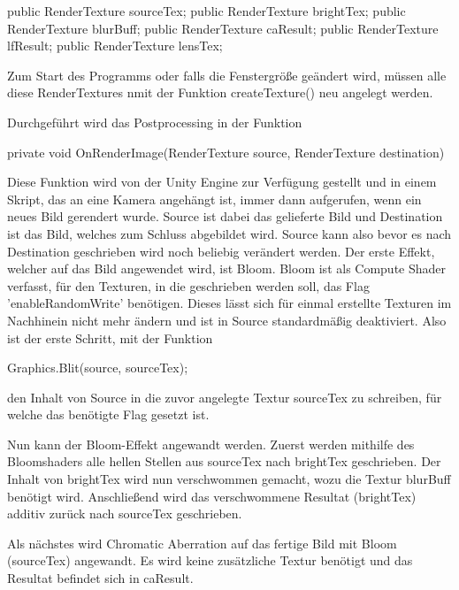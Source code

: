 \begin{csh}
    public RenderTexture sourceTex;
    public RenderTexture brightTex;
    public RenderTexture blurBuff;
    public RenderTexture caResult;
    public RenderTexture lfResult;
    public RenderTexture lensTex;
\end{csh}

Zum Start des Programms oder falls die Fenstergrö{\ss}e geändert wird, müssen alle diese RenderTextures nmit der Funktion createTexture() neu angelegt werden.

Durchgeführt wird das Postprocessing in der Funktion 
\begin{csh} 
private void OnRenderImage(RenderTexture source, RenderTexture destination) 
\end{csh}
Diese Funktion wird von der Unity Engine zur Verfügung gestellt und in einem Skript, das an eine Kamera angehängt ist, immer dann aufgerufen, wenn ein neues Bild gerendert wurde. Source ist dabei das gelieferte Bild und Destination ist das Bild, welches zum Schluss abgebildet wird. Source kann also bevor es nach Destination geschrieben wird noch beliebig verändert werden. Der erste Effekt, welcher auf das Bild angewendet wird, ist Bloom. Bloom ist als Compute Shader verfasst, für den Texturen, in die geschrieben werden soll, das Flag 'enableRandomWrite' benötigen. Dieses lässt sich für einmal erstellte Texturen im Nachhinein nicht mehr ändern und ist in Source standardmäßig deaktiviert. Also ist der erste Schritt, mit der Funktion 
\begin{csh}
Graphics.Blit(source, sourceTex);
\end{csh}
 den Inhalt von Source in die zuvor angelegte Textur sourceTex zu schreiben, für welche das benötigte Flag gesetzt ist.


Nun kann der Bloom-Effekt angewandt werden. Zuerst werden mithilfe des Bloomshaders alle hellen Stellen aus sourceTex nach brightTex geschrieben. Der Inhalt von brightTex wird nun verschwommen gemacht, wozu die Textur blurBuff benötigt wird. Anschlie{\ss}end wird das verschwommene Resultat (brightTex) additiv zurück nach sourceTex geschrieben.


Als nächstes wird Chromatic Aberration auf das fertige Bild mit Bloom (sourceTex) angewandt. Es wird keine zusätzliche Textur benötigt und das Resultat befindet sich in caResult.


